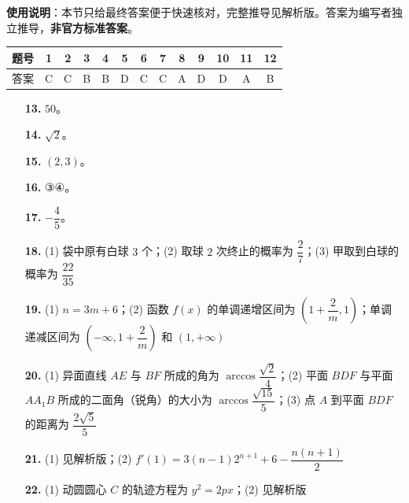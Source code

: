 
\begin{gknotice}
\textbf{使用说明}：本节只给最终答案便于快速核对，完整推导见解析版。答案为编写者独立推导，\textbf{非官方标准答案}。
\end{gknotice}

\begin{center}\begin{tabular}{ccccccccccccc}
\toprule
题号 & 1 & 2 & 3 & 4 & 5 & 6 & 7 & 8 & 9 & 10 & 11 & 12 \\
\midrule
答案 & C & C & B & B & D & C & C & A & D & D & A & B \\
\bottomrule
\end{tabular}\end{center}

\begin{itemize}[leftmargin=2.6em]
  \item[\textbf{13.}] $50$。
  \item[\textbf{14.}] $\sqrt{2}$。
  \item[\textbf{15.}] $(2, 3)$。
  \item[\textbf{16.}] ③④。
\end{itemize}

\begin{itemize}[leftmargin=2.6em]
  \item[\textbf{17.}] $-\dfrac{4}{5}$。
  \item[\textbf{18.}] (1) 袋中原有白球 $3$ 个；(2) 取球 $2$ 次终止的概率为 $\dfrac{2}{7}$；(3) 甲取到白球的概率为 $\dfrac{22}{35}$
  \item[\textbf{19.}] (1) $n = 3m + 6$；(2) 函数 $f(x)$ 的单调递增区间为 $\left(1 + \dfrac{2}{m}, 1\right)$；单调递减区间为 $\left(-\infty, 1 + \dfrac{2}{m}\right)$ 和 $(1, +\infty)$
  \item[\textbf{20.}] (1) 异面直线 $AE$ 与 $BF$ 所成的角为 $\arccos\dfrac{\sqrt{2}}{4}$；(2) 平面 $BDF$ 与平面 $AA_1B$ 所成的二面角（锐角）的大小为 $\arccos\dfrac{\sqrt{15}}{5}$；(3) 点 $A$ 到平面 $BDF$ 的距离为 $\dfrac{2\sqrt{5}}{5}$
  \item[\textbf{21.}] (1) 见解析版；(2) $f'(1) = 3(n-1)2^{n+1} + 6 - \dfrac{n(n+1)}{2}$
  \item[\textbf{22.}] (1) 动圆圆心 $C$ 的轨迹方程为 $y^2 = 2px$；(2) 见解析版
\end{itemize}
